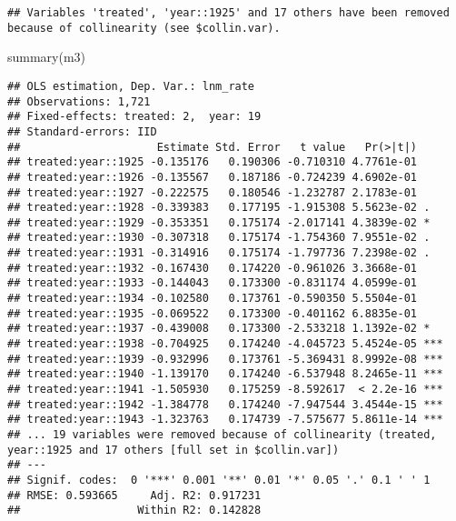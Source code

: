 \documentclass[
]{article}
\newenvironment{Shaded}{\begin{snugshade}}{\end{snugshade}}
\newcommand{\AttributeTok}[1]{\textcolor[rgb]{0.77,0.63,0.00}{#1}}
\newcommand{\DecValTok}[1]{\textcolor[rgb]{0.00,0.00,0.81}{#1}}
\newcommand{\FunctionTok}[1]{\textcolor[rgb]{0.00,0.00,0.00}{#1}}
\newcommand{\NormalTok}[1]{#1}
\newcommand{\SpecialCharTok}[1]{\textcolor[rgb]{0.00,0.00,0.00}{#1}}
\newcommand{\StringTok}[1]{\textcolor[rgb]{0.31,0.60,0.02}{#1}}
\begin{document}
\begin{verbatim}
## Variables 'treated', 'year::1925' and 17 others have been removed because of collinearity (see $collin.var).
\end{verbatim}

\begin{Shaded}
\begin{Highlighting}[]
\FunctionTok{summary}\NormalTok{(m3)}
\end{Highlighting}
\end{Shaded}

\begin{verbatim}
## OLS estimation, Dep. Var.: lnm_rate
## Observations: 1,721 
## Fixed-effects: treated: 2,  year: 19
## Standard-errors: IID 
##                     Estimate Std. Error   t value   Pr(>|t|)    
## treated:year::1925 -0.135176   0.190306 -0.710310 4.7761e-01    
## treated:year::1926 -0.135567   0.187186 -0.724239 4.6902e-01    
## treated:year::1927 -0.222575   0.180546 -1.232787 2.1783e-01    
## treated:year::1928 -0.339383   0.177195 -1.915308 5.5623e-02 .  
## treated:year::1929 -0.353351   0.175174 -2.017141 4.3839e-02 *  
## treated:year::1930 -0.307318   0.175174 -1.754360 7.9551e-02 .  
## treated:year::1931 -0.314916   0.175174 -1.797736 7.2398e-02 .  
## treated:year::1932 -0.167430   0.174220 -0.961026 3.3668e-01    
## treated:year::1933 -0.144043   0.173300 -0.831174 4.0599e-01    
## treated:year::1934 -0.102580   0.173761 -0.590350 5.5504e-01    
## treated:year::1935 -0.069522   0.173300 -0.401162 6.8835e-01    
## treated:year::1937 -0.439008   0.173300 -2.533218 1.1392e-02 *  
## treated:year::1938 -0.704925   0.174240 -4.045723 5.4524e-05 ***
## treated:year::1939 -0.932996   0.173761 -5.369431 8.9992e-08 ***
## treated:year::1940 -1.139170   0.174240 -6.537948 8.2465e-11 ***
## treated:year::1941 -1.505930   0.175259 -8.592617  < 2.2e-16 ***
## treated:year::1942 -1.384778   0.174240 -7.947544 3.4544e-15 ***
## treated:year::1943 -1.323763   0.174739 -7.575677 5.8611e-14 ***
## ... 19 variables were removed because of collinearity (treated, year::1925 and 17 others [full set in $collin.var])
## ---
## Signif. codes:  0 '***' 0.001 '**' 0.01 '*' 0.05 '.' 0.1 ' ' 1
## RMSE: 0.593665     Adj. R2: 0.917231
##                  Within R2: 0.142828
\end{verbatim}

\begin{Shaded}
\end{Shaded}
\end{document}
